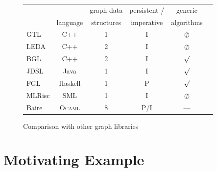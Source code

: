 \documentclass[tfpsymp,pagenumbers]{tfp07symp}
\newcommand{\ocamlgraph}{\textsc{Ocamlgraph}\xspace}
\newcommand{\ocaml}{\textsc{Ocaml}\xspace}
\begin{document}


\begin{figure}[t]
\newcommand{\present}{\large\boldmath $\surd$}
\newcommand{\absent}{\large\boldmath $\oslash$}

  \centering
  \begin{tabular}{|l||c|c|c|c|c|}
    \hline
     &          & graph data & persistent / & generic    \\
     & language & structures & imperative   & algorithms \\\hline\hline
     GTL \cite{Gtl} & C++     & 1  & I & \absent   \\\hline
     LEDA \cite{Leda} & C++    & 2  & I & \absent   \\\hline
     BGL \cite{Bgl} & C++     & 2  & I & \present  \\\hline
     JDSL \cite{Jdsl} & Java   & 1  & I & \present  \\\hline
     FGL \cite{Fgl} & Haskell & 1  & P & \present  \\\hline
     MLRisc \cite{Mlrisc} & SML  & 1  & I & \absent   \\\hline
     Baire \cite{Baire}\footnotemark & \ocaml & 8 &P/I& ---      \\\hline
  \end{tabular}
  \medskip
  \caption{Comparison with other graph libraries}
  \label{comparison:tab}
\end{figure}

\section{Motivating Example}\label{motivatingexample}
\end{document}
